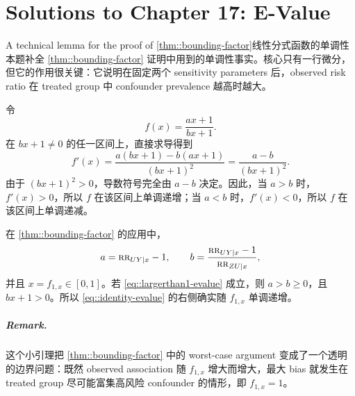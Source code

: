 \chapter{Solutions to Chapter 17: E-Value}
\label{sol:chapter17}

\begin{exercisesolution}{A technical lemma for the proof of \cref{thm::bounding-factor}}{线性分式函数的单调性}
本题补全 \cref{thm::bounding-factor} 证明中用到的单调性事实。核心只有一行微分，但它的作用很关键：它说明在固定两个 sensitivity parameters 后，observed risk ratio 在 treated group 中 confounder prevalence 越高时越大。

令
\[
f(x)=\frac{ax+1}{bx+1}.
\]
在 $bx+1\neq 0$ 的任一区间上，直接求导得到
\[
f'(x)
=\frac{a(bx+1)-b(ax+1)}{(bx+1)^2}
=\frac{a-b}{(bx+1)^2}.
\]
由于 $(bx+1)^2>0$，导数符号完全由 $a-b$ 决定。因此，当 $a>b$ 时，$f'(x)>0$，所以 $f$ 在该区间上单调递增；当 $a<b$ 时，$f'(x)<0$，所以 $f$ 在该区间上单调递减。

在 \cref{thm::bounding-factor} 的应用中，
\[
a=\textsc{rr}_{UY\mid x}-1,\qquad
b=\frac{\textsc{rr}_{UY\mid x}-1}{\textsc{rr}_{ZU\mid x}},
\]
并且 $x=f_{1,x}\in[0,1]$。若 \cref{eq::largerthan1-evalue} 成立，则 $a>b\geq 0$，且 $bx+1>0$。所以 \cref{eq::identity-evalue} 的右侧确实随 $f_{1,x}$ 单调递增。

\paragraph{Remark.}
这个小引理把 \cref{thm::bounding-factor} 中的 worst-case argument 变成了一个透明的边界问题：既然 observed association 随 $f_{1,x}$ 增大而增大，最大 bias 就发生在 treated group 尽可能富集高风险 confounder 的情形，即 $f_{1,x}=1$。
\end{exercisesolution}


